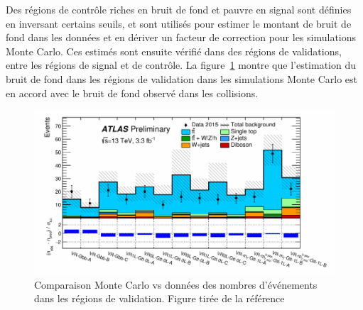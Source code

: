 
Des régions de contrôle riches en bruit de fond et pauvre en signal
sont définies en inversant certains seuils, et sont utilisés pour
estimer le montant de bruit de fond dans les données et en dériver un
facteur de correction pour les simulations Monte Carlo. Ces estimés sont ensuite
vérifié dans des régions de validations, entre les régions de signal
et de contrôle. La figure~\ref{fig:pull} montre que l'estimation du
bruit de fond dans les régions de validation dans les simulations
Monte Carlo est en accord avec le bruit de fond observé dans les
collisions.

\begin{figure}
  \centering
  \includegraphics[width=.8\textwidth]{pull.pdf}
  \caption{Comparaison Monte Carlo vs données des nombres d'événements
    dans les régions de validation. Figure tirée de la
    référence~\cite{ATLAS-CONF-2015-067}}
\label{fig:pull}
\end{figure}

